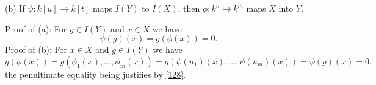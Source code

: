 \documentclass[parskip=half,fontsize=12pt]{scrartcl}%
\begin{document}
(b) If $\psi:k[u]\to k[t]$ maps $I(Y)$ to $I(X)$, then $\phi:k^n\to k^m$ maps $X$ into $Y$. 

Proof of (a): For $g\in I(Y)$ and $x\in X$ we have 
$$
\psi(g)(x)=g(\phi(x))=0.
$$ 
Proof of (b): For $x\in X$ and $g\in I(Y)$ we have 
$$
g(\phi(x))=g(\phi_1(x),\dots,\phi_m(x))=g(\psi(u_1)(x),\dots,\psi(u_m)(x))=\psi(g)(x)=0,
$$ 
the penultimate equality being justifies by \eqref{128}.


\begin{comment}

\subsection{Page 16, Exercise 1.28}%

We assume that our field $k$ is \emph{infinite} (but not necessarily algebraically closed). We shall prove that, in the setting of the exercise, there are inverse bijections 
$$
\begin{tikzcd}
\text{Hom}(X,Y)\ar[r,yshift=4pt,"F"]&\text{Hom}(P(Y),P(X))\ar[l,yshift=-4pt,"G"],
\end{tikzcd}
$$ 
where the first $\text{Hom}$ is the set of regular morphisms from $X$ to $Y$ and the second $\text{Hom}$ is the set of $k$-algebra morphisms from $P(Y)$ to $P(X)$. We shall use the following notation:
$$
t=(t_1,\dots,t_n),\ u=(u_1,\dots,u_m),\ x=(x_1,\dots,x_n),%
$$ 
where the $t_i$ and $u_j$ are indeterminates, and the $x_i$ are in $k$.

$\bullet$ Definition of $F$. Let $\varphi:X\to Y$ be regular, that is, $\varphi$ is induced by a polynomial map $\widetilde\varphi:k^n\to k^m$. Define the $k$-algebra morphism 
$$
\widetilde\Phi:k[u]\to k[t]
$$ 
by 
$$
\widetilde\Phi(g):=g\circ \widetilde\varphi.
$$ 
It is easy to see that $\widetilde\Phi$ induces a $k$-algebra morphism $\Phi:P(Y)\to P(X)$ which does not depend on the choice of $\widetilde\varphi$. Set $F(\varphi):=\Phi$, that is 
$$
\widetilde{F(\varphi)}(g):=g\circ\widetilde\varphi.
$$ 

$\bullet$ Definition of $G$. Let $\Phi:P(Y)\to P(X)$ be a $k$-algebra morphism. Then $\Phi$ lifts to a $k$-algebra morphism $\widetilde\Phi:k[u]\to k[t]$. Define the polynomial map $\widetilde\varphi:k^n\to k^m$ by 
$$
u_i(\widetilde\varphi(x)):=\widetilde\Phi(u_i)(x).
$$ 
Let $g\in k[u]$ and $x\in k^n$, and let us show 
$$%
g\left(\widetilde\Phi(u_1)(x),\dots,\widetilde\Phi(u_m)(x)\right)=\widetilde\Phi(g)(x).
$$%
It suffices to prove this for $g=u_i$, which is straightforward. 


\end{comment}
\end{document}
